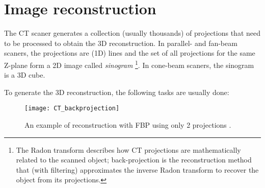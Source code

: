 \section{Image reconstruction}
The CT scaner generates a collection (usually thousands) of
projections that need to be processed to obtain the 3D
reconstruction. In parallel- and fan-beam scaners, the projections are
(1D) lines and the set of all projections for the same Z-plane form a
2D image called \emph{sinogram}
\cite{wikipedia2025radom_transform}\footnote{The Radon transform
  describes how CT projections are mathematically related to the
  scanned object; back-projection is the reconstruction method that
  (with filtering) approximates the inverse Radon transform to recover
  the object from its projections.}. In cone-beam scaners, the
sinogram is a 3D cube.

To generate the 3D reconstruction, the following tasks are usually done:

\begin{figure}
  \centering
  \texttt{[image: CT\_backprojection]}
  \caption{An example of reconstruction with FBP using only 2
    projections
    \cite{abdulla2025acquiring2}.\label{fig:CT_reconstruction}}
\end{figure}

